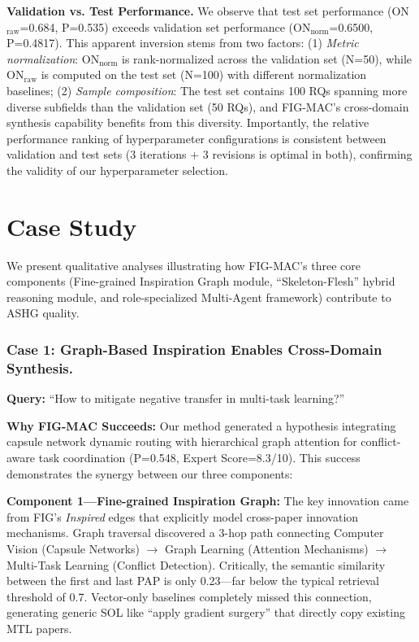\documentclass[runningheads]{llncs}
\begin{document}
\textbf{Validation vs. Test Performance.} We observe that test set performance (ON$_{\text{raw}}$=0.684, P=0.535) exceeds validation set performance (ON$_{\text{norm}}$=0.6500, P=0.4817). This apparent inversion stems from two factors: (1) \textit{Metric normalization}: ON$_{\text{norm}}$ is rank-normalized across the validation set (N=50), while ON$_{\text{raw}}$ is computed on the test set (N=100) with different normalization baselines; (2) \textit{Sample composition}: The test set contains 100 RQs spanning more diverse subfields than the validation set (50 RQs), and FIG-MAC's cross-domain synthesis capability benefits from this diversity. Importantly, the relative performance ranking of hyperparameter configurations is consistent between validation and test sets (3 iterations + 3 revisions is optimal in both), confirming the validity of our hyperparameter selection.

\section{Case Study}
\label{sec:case_study}

We present qualitative analyses illustrating how FIG-MAC's three core components (Fine-grained Inspiration Graph module, ``Skeleton-Flesh'' hybrid reasoning module, and role-specialized Multi-Agent framework) contribute to ASHG quality.

\subsubsection{Case 1: Graph-Based Inspiration Enables Cross-Domain Synthesis.}
\label{sec:case1}

\textbf{Query:} ``How to mitigate negative transfer in multi-task learning?''

\textbf{Why FIG-MAC Succeeds:} Our method generated a hypothesis integrating capsule network dynamic routing with hierarchical graph attention for conflict-aware task coordination (P=0.548, Expert Score=8.3/10). This success demonstrates the synergy between our three components:

\textbf{Component 1---Fine-grained Inspiration Graph:} The key innovation came from FIG's \emph{Inspired} edges that explicitly model cross-paper innovation mechanisms. Graph traversal discovered a 3-hop path connecting Computer Vision (Capsule Networks) $\rightarrow$ Graph Learning (Attention Mechanisms) $\rightarrow$ Multi-Task Learning (Conflict Detection). Critically, the semantic similarity between the first and last PAP is only 0.23---far below the typical retrieval threshold of 0.7. Vector-only baselines completely missed this connection, generating generic SOL like ``apply gradient surgery'' that directly copy existing MTL papers.
\end{document}
